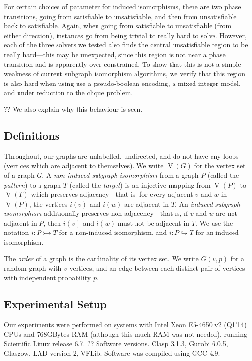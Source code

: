 \documentclass[letterpaper]{article}
\begin{document}
For certain choices of parameter for induced isomorphisms, there are two phase transitions, going
from satisfiable to unsatisfiable, and then from unsatisfiable back to satisfiable. Again, when
going from satisfiable to unsatisfiable (from either direction), instances go from being trivial to
really hard to solve. However, each of the three solvers we tested also finds the central
unsatisfiable region to be really hard---this may be unexpected, since this region is not near a
phase transition and is apparently over-constrained. To show that this is not a simple weakness of
current subgraph isomorphism algorithms, we verify that this region is also hard when using use a
pseudo-boolean encoding, a mixed integer model, and under reduction to the clique problem.

?? We also explain why this behaviour is seen.

\subsection{Definitions}

Throughout, our graphs are unlabelled, undirected, and do not have any loops (vertices which are
adjacent to themselves). We write $\operatorname{V}(G)$ for the vertex set of a graph $G$. A
\emph{non-induced subgraph isomorphism} from a graph $P$ (called the \emph{pattern}) to a graph $T$
(called the \emph{target}) is an injective mapping from $\operatorname{V}(P)$ to
$\operatorname{V}(T)$ which preserves adjacency---that is, for every adjacent $v$ and $w$ in
$\operatorname{V}(P)$, the vertices $i(v)$ and $i(w)$ are adjacent in $T$. An \emph{induced subgraph
isomorphism} additionally preserves non-adjacency---that is, if $v$ and $w$ are not adjacent in $P$,
then $i(v)$ and $i(w)$ must not be adjacent in $T$. We use the notation $i : P \rightarrowtail T$
for a non-induced isomorphism, and $i : P \hookrightarrow T$ for an induced isomorphism.

The \emph{order} of a graph is the cardinality of its vertex set.  We write $G(v, p)$ for a random
graph with $v$ vertices, and an edge between each distinct pair of vertices with independent
probability $p$.

\subsection{Experimental Setup}

Our experiments were performed on systems with Intel Xeon E5-4650 v2 (Q1'14) CPUs and 768GBytes RAM
(although this much RAM was not needed), running Scientific Linux release 6.7.   ?? Software
versions. Clasp 3.1.3, Gurobi 6.0.5, Glasgow, LAD version 2, VFLib. Software was compiled using GCC
4.9.
\end{document}
